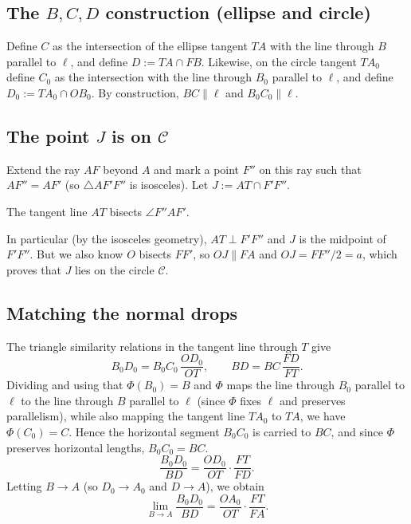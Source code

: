 \subsection{The \texorpdfstring{$B,C,D$}{B,C,D} construction (ellipse and circle)}

Define $C$ as the intersection of the ellipse tangent $TA$ with the line through $B$ parallel to $\ell$, and define $D:=TA\cap FB$. Likewise, on the circle tangent $TA_0$ define $C_0$ as the intersection with the line through $B_0$ parallel to $\ell$, and define $D_0:=TA_0\cap OB_0$. By construction, $BC\parallel\ell$ and $B_0C_0\parallel\ell$.

\subsection{The point \texorpdfstring{$J$}{J} is on \texorpdfstring{$\mathcal{C}$}{C}}

Extend the ray $AF$ beyond $A$ and mark a point $F''$ on this ray such that $AF''=AF'$ (so $\triangle AF'F''$ is isosceles). Let $J:=AT\cap F'F''$.

\begin{lemma}
  The tangent line $AT$ bisects $\angle F''AF'$.
\end{lemma}

In particular (by the isosceles geometry), $AT\perp F'F''$ and $J$ is the midpoint of $F'F''$. But we also know $O$ bisects $FF'$, so $OJ\parallel FA$ and $OJ=FF''/2=a$, which proves that $J$ lies on the circle $\mathcal{C}$.

\subsection{Matching the normal drops}

The triangle similarity relations in the tangent line through $T$ give
\begin{equation}
  B_0D_0 = B_0C_0\,\frac{OD_0}{OT},
  \qquad
  BD = BC\,\frac{FD}{FT}.
\end{equation}
Dividing and using that $\Phi(B_0)=B$ and $\Phi$ maps the line through $B_0$ parallel to $\ell$ to the line through $B$ parallel to $\ell$ (since $\Phi$ fixes $\ell$ and preserves parallelism), while also mapping the tangent line $TA_0$ to $TA$, we have $\Phi(C_0)=C$. Hence the horizontal segment $B_0C_0$ is carried to $BC$, and since $\Phi$ preserves horizontal lengths, $B_0C_0=BC$.
\begin{equation}
  \frac{B_0D_0}{BD}=\frac{OD_0}{OT}\cdot\frac{FT}{FD}.
\end{equation}
Letting $B\to A$ (so $D_0\to A_0$ and $D\to A$), we obtain
\begin{equation}
  \lim_{B\to A}\frac{B_0D_0}{BD}=\frac{OA_0}{OT}\cdot\frac{FT}{FA}.
\end{equation}

